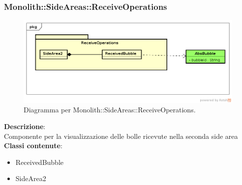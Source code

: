 \clearpage

\subsubsection{Monolith::SideAreas::ReceiveOperations}
   \FloatBarrier
   \begin{figure}[ht]
   \centering
\includegraphics[width=\textwidth,keepaspectratio]{img/sd2_pkg}
   \caption{Diagramma per Monolith::SideAreas::ReceiveOperations.}
\end{figure}
\FloatBarrier
\textbf{Descrizione}:\\
 Componente per la visualizzazione delle bolle ricevute nella seconda side area 
\\ \textbf{Classi contenute}:\\
\begin{itemize}
\item ReceivedBubble
\item SideArea2
\end{itemize}


\clearpage

